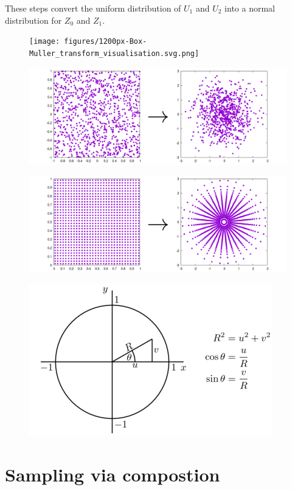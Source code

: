 \documentclass{article}
\begin{document}
These steps convert the uniform distribution of \( U_1 \) and \( U_2 \) into a normal distribution for \( Z_0 \) and \( Z_1 \).
\begin{figure}
    \centering
    \texttt{[image: figures/1200px-Box-Muller\_transform\_visualisation.svg.png]}
    
    
\end{figure}
\begin{figure}
    \centering
    \includegraphics[width=0.75\linewidth]{ox-hilary/simulation-methods/figures/polar_rand_transform.png}
\end{figure}
\begin{figure}
    \centering
    \includegraphics[width=0.75\linewidth]{ox-hilary/simulation-methods/figures/cartesian_grid_transform.png}
\end{figure}
\begin{figure}
    \centering
    \includegraphics[width=0.75\linewidth]{ox-hilary/simulation-methods/figures/400px-BoxMullerTransformUsingPolarCoordinates.png}
\end{figure}

\section{Sampling via compostion}
\end{document}
